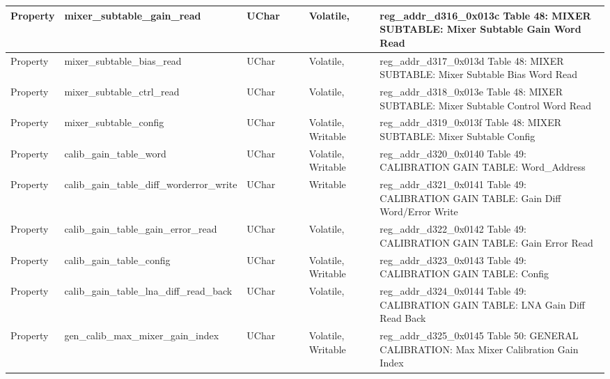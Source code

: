 \documentclass{article}
\begin{document}
\begin{scriptsize}
\begin{longtable}{|p{2cm}|p{5cm}|p{1cm}|p{2cm}|p{2cm}|p{1.75cm}|p{1.5cm}|p{5.1cm}|}
  \hline
  Property & mixer\_subtable\_gain\_read                              & UChar &                  &                  & Volatile,           &         & reg\_addr\_d316\_0x013c Table 48: MIXER SUBTABLE: Mixer Subtable Gain Word Read \\
  \hline
  Property & mixer\_subtable\_bias\_read                              & UChar &                  &                  & Volatile,           &         & reg\_addr\_d317\_0x013d Table 48: MIXER SUBTABLE: Mixer Subtable Bias Word Read \\
  \hline
  Property & mixer\_subtable\_ctrl\_read                              & UChar &                  &                  & Volatile,           &         & reg\_addr\_d318\_0x013e Table 48: MIXER SUBTABLE: Mixer Subtable Control Word Read \\
  \hline
  Property & mixer\_subtable\_config                                  & UChar &                  &                  & Volatile,  Writable &         & reg\_addr\_d319\_0x013f Table 48: MIXER SUBTABLE: Mixer Subtable Config \\
  \hline
  Property & calib\_gain\_table\_word                                 & UChar &                  &                  & Volatile,  Writable &         & reg\_addr\_d320\_0x0140 Table 49: CALIBRATION GAIN TABLE: Word\_Address \\
  \hline
  Property & calib\_gain\_table\_diff\_worderror\_write               & UChar &                  &                  &            Writable &         & reg\_addr\_d321\_0x0141 Table 49: CALIBRATION GAIN TABLE: Gain Diff Word/Error Write \\
  \hline
  Property & calib\_gain\_table\_gain\_error\_read                    & UChar &                  &                  & Volatile,           &         & reg\_addr\_d322\_0x0142 Table 49: CALIBRATION GAIN TABLE: Gain Error Read \\
  \hline
  Property & calib\_gain\_table\_config                               & UChar &                  &                  & Volatile,  Writable &         & reg\_addr\_d323\_0x0143 Table 49: CALIBRATION GAIN TABLE: Config \\
  \hline
  Property & calib\_gain\_table\_lna\_diff\_read\_back                & UChar &                  &                  & Volatile,           &         & reg\_addr\_d324\_0x0144 Table 49: CALIBRATION GAIN TABLE: LNA Gain Diff Read Back \\
  \hline
  Property & gen\_calib\_max\_mixer\_gain\_index                      & UChar &                  &                  & Volatile,  Writable &         & reg\_addr\_d325\_0x0145 Table 50: GENERAL CALIBRATION: Max Mixer Calibration Gain Index \\

\end{longtable}
\end{scriptsize}
\end{document}
